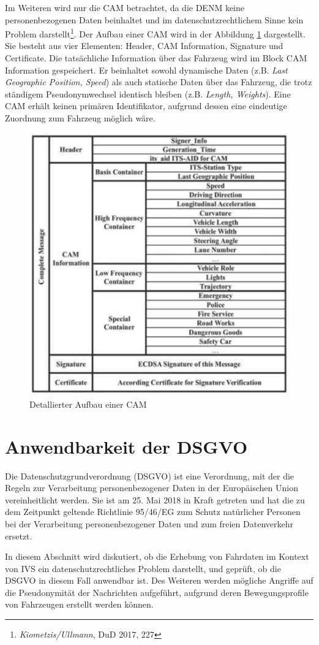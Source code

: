 Im Weiteren wird nur die CAM betrachtet, da die DENM keine personenbezogenen Daten beinhaltet und im datenschutzrechtlichem Sinne kein Problem darstellt\footnote{\emph{Kiometzis/Ullmann}, DuD 2017, 227}\nocite{Kiometzis2017}. Der Aufbau einer CAM wird in der Abbildung \ref{fig:cam} dargestellt. Sie besteht aus vier Elementen: Header, CAM Information, Signature und Certificate. Die tatsächliche Information über das Fahrzeug wird im Block CAM Information gespeichert. Er beinhaltet sowohl dynamische Daten (z.B. \textit{Last Geographic Position, Speed}) als auch statische Daten über das Fahrzeug, die trotz ständigem Pseudonymwechsel identisch bleiben (z.B. \textit{Length, Weights}). Eine CAM erhält keinen primären Identifikator, aufgrund dessen eine eindeutige Zuordnung zum Fahrzeug möglich wäre.

\begin{figure}
	\centering
	\includegraphics[width=0.4\linewidth]{images/CAM}
	\caption[Detallierter Aufbau einer CAM]{Detallierter Aufbau einer CAM\footnotemark}
	\label{fig:cam}
\end{figure}


\section{Anwendbarkeit der DSGVO}
\label{ch:SecondContentSection}

Die Datenschutzgrundverordnung (DSGVO) ist eine Verordnung, mit der die Regeln zur Verarbeitung personenbezogener Daten in der Europäischen Union vereinheitlicht werden. Sie ist am 25. Mai 2018 in Kraft getreten und hat die zu dem Zeitpunkt geltende Richtlinie 95/46/EG zum Schutz natürlicher Personen bei der Verarbeitung personenbezogener Daten und zum freien Datenverkehr ersetzt. 

In diesem Abschnitt wird diskutiert, ob die Erhebung von Fahrdaten im Kontext von IVS ein datenschutzrechtliches Problem darstellt, und geprüft, ob die DSGVO in diesem Fall anwendbar ist. Des Weiteren werden mögliche Angriffe auf die Pseudonymität der Nachrichten aufgeführt, aufgrund deren Bewegungsprofile von Fahrzeugen erstellt werden können. 

